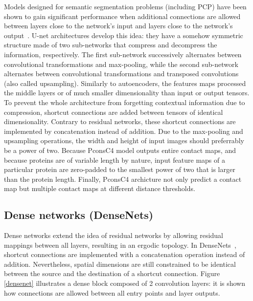         Models designed for semantic segmentation problems (including PCP) have been shown
        to gain significant performance when additional connections are allowed between
        layers close to the network's input and layers close to the network's output~\cite{huang2017densely}.
        U-net architectures develop this idea: they have a somehow symmetric structure made of two sub-networks
        that compress and decompress the information, respectively.
        The first sub-network successively alternates between convolutional transformations
        and max-pooling, while the second sub-network alternates between convolutional
        transformations and transposed convolutions (also called upsampling).
        Similarly to autoencoders, the features maps
        processed the middle layers or of much smaller dimensionality than input or output tensors.
        To prevent the whole architecture from forgetting contextual information due to
        compression, shortcut connections are added between tensors of identical dimensionality.
        Contrary to residual networks, these shortcut connections are implemented by
        concatenation instead of addition. Due to the max-pooling and upsampling operations,
        the width and height of input images should preferrably be a power of two.
        Because PconsC4 model outputs entire contact maps, and because proteins are
        of variable length by nature, input feature maps of a particular protein are zero-padded
        to the smallest power of two that is larger than the protein length.
        Finally, PconsC4 archicture not only predict a contact map but multiple contact maps
        at different distance thresholds.

    \subsection{Dense networks (DenseNets)}

        Dense networks extend the idea of residual networks by allowing residual mappings
        between all layers, resulting in an ergodic topology. In DenseNets~\cite{huang2017densely},
        shortcut connections are implemented with a concatenation operation instead of addition.
        Nevertheless, spatial dimensions are still constrained to be identical between the source and the destination
        of a shortcut connection. Figure \ref{densenet} illustrates a dense block composed of
        2 convolution layers: it is shown how connections are allowed between all entry points and layer outputs.

